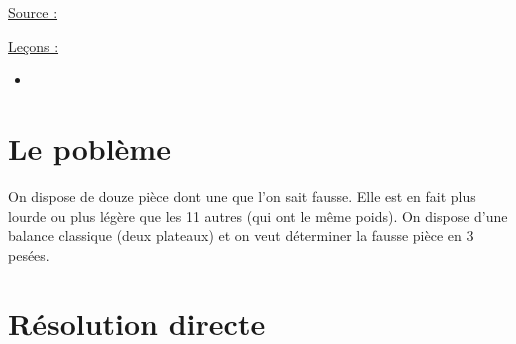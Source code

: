 

\pagestyle{fancy}

\fancyhead[C]{}
\fancyhead[R]{}



\underline{Source :} 

\underline{Leçons :}
\begin{itemize}
\item 
\end{itemize}

\section{Le poblème}

On dispose de douze pièce dont une que l'on sait fausse. 
Elle est en fait plus lourde ou plus légère que les 11 autres (qui ont le même poids).
On dispose d'une balance classique (deux plateaux) et on veut déterminer la fausse pièce en 3 pesées.

\section{Résolution \og directe \fg{}}

